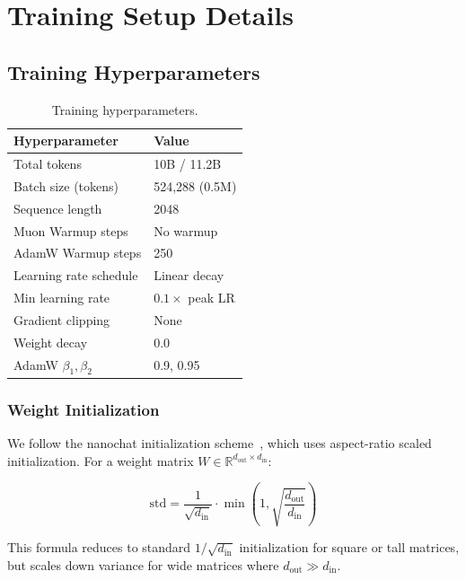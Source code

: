 \documentclass{article}
\theoremstyle{plain}
\theoremstyle{definition}
\theoremstyle{remark}
\begin{document}
\section{Training Setup Details}
\label{app:training_setup}



\subsection{Training Hyperparameters}

\begin{table}[h]
\centering
\caption{Training hyperparameters.}
\label{tab:training_hyperparams}
\small
\begin{tabular}{@{}ll@{}}
\toprule
\textbf{Hyperparameter} & \textbf{Value} \\
\midrule
Total tokens & 10B / 11.2B \\
Batch size (tokens) & 524,288 (0.5M) \\
Sequence length & 2048 \\
Muon Warmup steps & No warmup\\
AdamW Warmup steps & 250 \\
Learning rate schedule & Linear decay \\
Min learning rate & $0.1 \times$ peak LR \\
Gradient clipping & None \\
Weight decay & 0.0 \\
AdamW $\beta_1, \beta_2$ & 0.9, 0.95 \\
\bottomrule
\end{tabular}
\end{table}

\subsubsection{Weight Initialization}

We follow the nanochat initialization scheme~\cite{karpathy2025nanochat}, which uses aspect-ratio scaled initialization. For a weight matrix $W \in \mathbb{R}^{d_{\text{out}} \times d_{\text{in}}}$:

\begin{equation}
\text{std} = \frac{1}{\sqrt{d_{\text{in}}}} \cdot \min\left(1, \sqrt{\frac{d_{\text{out}}}{d_{\text{in}}}}\right)
\end{equation}

This formula reduces to standard $1/\sqrt{d_{\text{in}}}$ initialization for square or tall matrices, but scales down variance for wide matrices where $d_{\text{out}} \gg d_{\text{in}}$.
\end{document}

